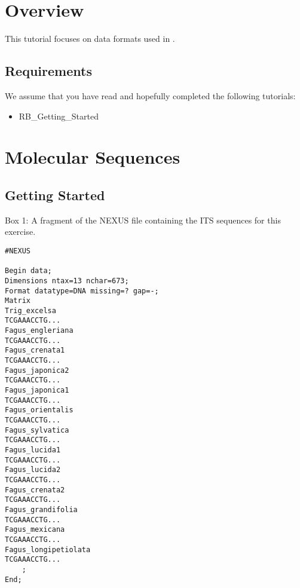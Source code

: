 \section{Overview}


This tutorial focuses on data formats used in \RevBayes.


\subsection*{Requirements}
We assume that you have read and hopefully completed the following tutorials:
\begin{itemize}
\item RB\_Getting\_Started
\end{itemize}



%
%
%
\newpage
\FloatBarrier
\section{Molecular Sequences}

\bigskip
\subsection{Getting Started}




\begin{center}
Box 1: A fragment of the NEXUS file containing the ITS sequences for this exercise. \\
\end{center}
{\tt \scriptsize \begin{framed}
\begin{lstlisting}
#NEXUS 

Begin data;
Dimensions ntax=13 nchar=673;
Format datatype=DNA missing=? gap=-;
Matrix
Trig_excelsa   
TCGAAACCTG...
Fagus_engleriana   
TCGAAACCTG...
Fagus_crenata1   
TCGAAACCTG...
Fagus_japonica2   
TCGAAACCTG...
Fagus_japonica1   
TCGAAACCTG...
Fagus_orientalis   
TCGAAACCTG...
Fagus_sylvatica   
TCGAAACCTG...
Fagus_lucida1   
TCGAAACCTG...
Fagus_lucida2   
TCGAAACCTG...
Fagus_crenata2   
TCGAAACCTG...
Fagus_grandifolia   
TCGAAACCTG...
Fagus_mexicana   
TCGAAACCTG...
Fagus_longipetiolata   
TCGAAACCTG...
	;
End;
\end{lstlisting}
\end{framed}}


